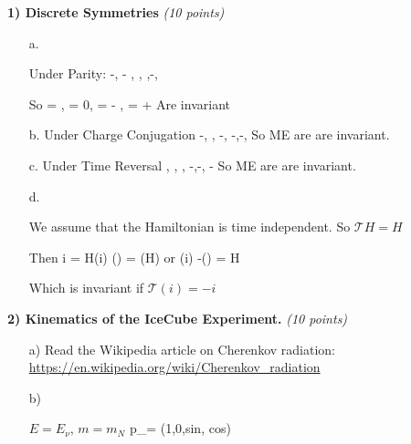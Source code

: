 {\large

\textbf{1) Discrete Symmetries } \hfill \textit{(10 points)}\\

\begin{itemize}
\item[a.]{ Under Parity:
\be
  \rightarrow -, \vec{\triangledown} \rightarrow - \vec{\triangledown}, \rho \rightarrow \rho,  \rightarrow{},\rightarrow-,  \rightarrow {}
\ee

So 
\be
 \vec{\triangledown} \cdot {} = \rho,  \vec{\triangledown} \cdot {} = 0,   \vec{\triangledown} \times {} = - ,  \vec{\triangledown} \times {} =  + 
\ee
Are invariant
}
\item[b.]{ Under Charge Conjugation
\be
  \rightarrow -, \vec{\triangledown} \rightarrow \vec{\triangledown}, \rho \rightarrow -\rho,  \rightarrow -,\rightarrow-,  \rightarrow {}
\ee
So ME are are invariant.
}
\item[c.]{ Under Time Reversal
\be
  \rightarrow {}, \vec{\triangledown} \rightarrow \vec{\triangledown}, \rho \rightarrow \rho,  \rightarrow -,\rightarrow-,  \rightarrow -
\ee
So ME are are invariant.
}
\item[d.]{ 
We assume that the Hamiltonian is time independent.  So $\mathcal{T}H = H$

Then
\be
i \psi = H\psi   \rightarrow {}(i) ()  \psi = (H)\psi
\ee
or
\be
 (i) -()  \psi = H\psi
\ee

Which is invariant if $\mathcal{T}(i) = -i$
}
\end{itemize}

\vspace*{0.25in}


\textbf{2) Kinematics of the IceCube Experiment. } \hfill \textit{(10 points)}\\

\begin{itemize}
\item[a)]{Read the Wikipedia article on Cherenkov radiation:  \href{https://en.wikipedia.org/wiki/Cherenkov_radiation}{https://en.wikipedia.org/wiki/Cherenkov\_radiation}}
\item[b)]{
$E = E_{\nu}$, $m = m_N$ 
\be
p_\mu = (1,0,sin\theta, cos\theta)
\ee

}
\end{itemize}}
